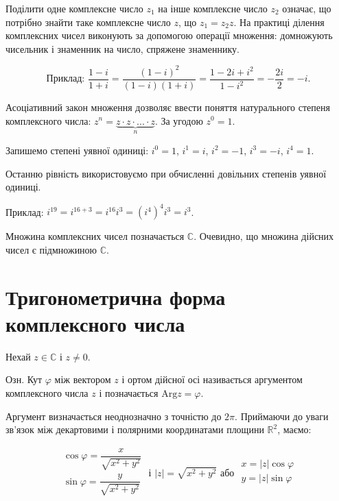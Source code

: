 Поділити одне комплексне число $z_1$ на інше комплексне число $z_2$ означає, що
потрібно знайти таке комплексне число $z$, що $z_1 = z_2z$. На практиці ділення 
комплексних чисел виконують за допомогою операції множення: домножують
чисельник і знаменник на число, спряжене знаменнику.

$$\text{Приклад: }\dfrac{1-i}{1+i} = \dfrac{(1-i)^2}{(1-i)(1+i)} = \dfrac{1 - 2i + i^2}{1-i^2} = -\dfrac{2i}{2} = -i.$$

Асоціативний закон множення дозволяє ввести поняття натурального степеня
комплексного числа: $z^n = \underbrace{z \cdot z \cdot ... \cdot z}\limits_n$. За угодою $z^0 = 1$.

Запишемо степені уявної одиниці: $i^0 = 1$, $i^1 = i$, $i^2 = -1$, $i^3 = -i$, $i^4 = 1$.

Останню рівність використовуємо при обчисленні довільних степенів уявної
одиниці.

Приклад: $i^{19} = i^{16 + 3} = i^{16} i^{3} = (i^4)^4i^3 = i^3$.

Множина комплексних чисел позначається $\mathbb{C}$. Очевидно, що множина
дійсних чисел є підмножиною $\mathbb{C}$.

\section{Тригонометрична форма комплексного числа}

Нехай $z \in \mathbb{C}$ і $z \neq 0$.

\begin{definition}
	Озн. Кут $\varphi$ між вектором $z$ і ортом дійсної осі називається аргументом
	комплексного числа $z$ і позначається $\text{Arg}z = \varphi$.
\end{definition}

\parbox{3cm}{}
\parbox{9cm}{
Аргумент визначається неоднозначно з точністю до $2\pi$.
Приймаючи до уваги зв'язок між декартовими і
полярними координатами площини $\mathbb{R}^2$, маємо:

$$\begin{array}{l}
	\cos \varphi = \dfrac{x}{\sqrt{x^2 + y^2}} \\
	\sin \varphi = \dfrac{y}{\sqrt{x^2 + y^2}} \\
\end{array}\text{ і }|z| = \sqrt{x^2 + y^2}\text{ або }\begin{array}{l}
	x = |z|\cos\varphi \\
	y = |z|\sin\varphi \\
\end{array}$$
}


